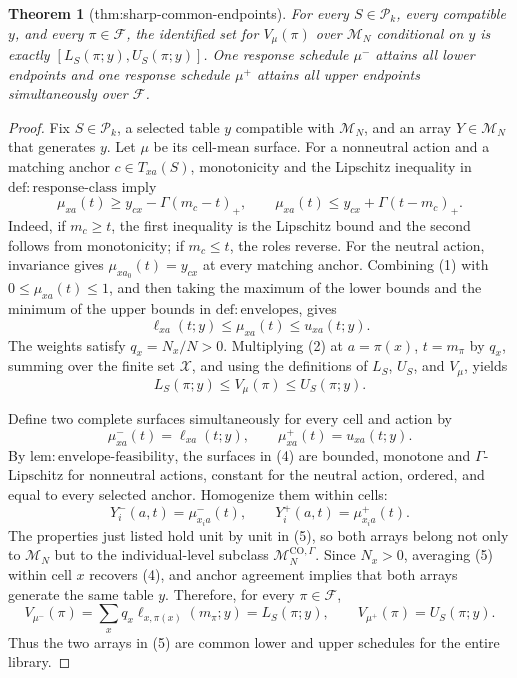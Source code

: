 \documentclass{article}
\newtheorem{theorem}{Theorem}
\begin{document}
\begin{theorem}[thm:sharp-common-endpoints]\label{thm:sharp-common-endpoints}
For every \(S\in\mathcal P_k\), every compatible \(y\), and every \(\pi\in\mathcal F\), the identified set for \(V_{\mu}(\pi)\) over \(\mathcal M_N\) conditional on \(y\) is exactly \([L_S(\pi;y),U_S(\pi;y)]\). One response schedule \(\mu^{-}\) attains all lower endpoints and one response schedule \(\mu^{+}\) attains all upper endpoints simultaneously over \(\mathcal F\).
\end{theorem}
\begin{proof}
Fix \(S\in\mathcal P_k\), a selected table \(y\) compatible with \(\mathcal M_N\), and an array \(Y\in\mathcal M_N\) that generates \(y\).  Let \(\mu\) be its cell-mean surface.  For a nonneutral action and a matching anchor \(c\in T_{xa}(S)\), monotonicity and the Lipschitz inequality in \(\mathrm{def{:}response\text{-}class}\) imply
\[
\mu_{xa}(t)
\geq y_{cx}-\Gamma(m_c-t)_+,
\qquad
\mu_{xa}(t)
\leq y_{cx}+\Gamma(t-m_c)_+.
\tag{1}
\]
Indeed, if \(m_c\geq t\), the first inequality is the Lipschitz bound and the second follows from monotonicity; if \(m_c\leq t\), the roles reverse.  For the neutral action, invariance gives \(\mu_{x a_0}(t)=y_{cx}\) at every matching anchor.  Combining (1) with \(0\leq\mu_{xa}(t)\leq1\), and then taking the maximum of the lower bounds and the minimum of the upper bounds in \(\mathrm{def{:}envelopes}\), gives
\[
\ell_{xa}(t;y)\leq\mu_{xa}(t)\leq u_{xa}(t;y).
\tag{2}
\]
The weights satisfy \(q_x=N_x/N>0\).  Multiplying (2) at \(a=\pi(x)\), \(t=m_\pi\) by \(q_x\), summing over the finite set \(\mathcal X\), and using the definitions of \(L_S\), \(U_S\), and \(V_\mu\), yields
\[
L_S(\pi;y)
\leq V_\mu(\pi)
\leq U_S(\pi;y).
\tag{3}
\]

Define two complete surfaces simultaneously for every cell and action by
\[
\mu^-_{xa}(t)=\ell_{xa}(t;y),
\qquad
\mu^+_{xa}(t)=u_{xa}(t;y).
\tag{4}
\]
By \(\mathrm{lem{:}envelope\text{-}feasibility}\), the surfaces in (4) are bounded, monotone and \(\Gamma\)-Lipschitz for nonneutral actions, constant for the neutral action, ordered, and equal to every selected anchor.  Homogenize them within cells:
\[
Y_i^-(a,t)=\mu^-_{x_i a}(t),
\qquad
Y_i^+(a,t)=\mu^+_{x_i a}(t).
\tag{5}
\]
The properties just listed hold unit by unit in (5), so both arrays belong not only to \(\mathcal M_N\) but to the individual-level subclass \(\mathcal M_N^{\mathrm{CO},\Gamma}\).  Since \(N_x>0\), averaging (5) within cell \(x\) recovers (4), and anchor agreement implies that both arrays generate the same table \(y\).  Therefore, for every \(\pi\in\mathcal F\),
\[
V_{\mu^-}(\pi)
=\sum_xq_x\ell_{x,\pi(x)}(m_\pi;y)
=L_S(\pi;y),
\qquad
V_{\mu^+}(\pi)
=U_S(\pi;y).
\tag{6}
\]
Thus the two arrays in (5) are common lower and upper schedules for the entire library.


\end{proof}
\end{document}
